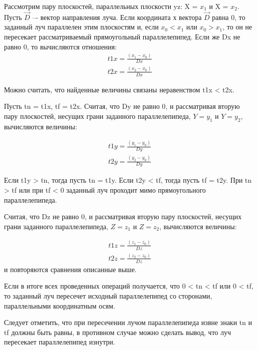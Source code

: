\documentclass[12pt,a4paper,oneside]{report}
\begin{document}
	 Рассмотрим пару плоскостей, параллельных плоскости yz: X = $x_1$ и X = $x_2$. Пусть $\vec{D}$ –- вектор направления луча. Если координата х вектора $\vec{D}$ равна 0, то заданный луч параллелен этим плоскостям и, если $x_0 < x_1$ или $x_0 > x_1$, то он не пересекает рассматриваемый прямоугольный параллелепипед. Если же Dx не равно 0, то вычисляются отношения:
	\begin{equation}
	\begin{gathered}
		t1x = \frac{(x_1 - x_0)}{Dx}\\
		t2x = \frac{(x_2 - x_0)}{Dx}
	\end{gathered}
	\end{equation}
	
	 Можно считать, что найденные величины связаны неравенством t1x < t2x.
	
	 Пусть tn = t1x, tf = t2x. Считая, что Dy не равно 0, и рассматривая вторую пару плоскостей, несущих грани заданного параллелепипеда, $Y = y_1$ и $Y = y_2$, вычисляются величины:
	
	\begin{equation}
	\begin{gathered}
	t1y = \frac{(y_1 - y_0)}{Dy}\\
	t2y = \frac{(y_2 - y_0)}{Dy}
	\end{gathered}
	\end{equation}
	
	 Если t1y > tn, тогда пусть tn = t1y. Если t2y < tf, тогда пусть tf = t2y.
	При tn > tf или при tf < 0 заданный луч проходит мимо прямоугольного параллелепипеда.
	
	 Считая, что Dz не равно 0, и рассматривая вторую пару плоскостей, несущих грани заданного параллелепипеда, $Z = z_1$ и $Z = z_2$, вычисляются величины:
	
	\begin{equation}
	\begin{gathered}
	t1z = \frac{(z_1 - z_0)}{Dz}\\
	t2z = \frac{(z_2 - z_0)}{Dz}
	\end{gathered}
	\end{equation}
	и повторяются сравнения описанные выше.
	
	 Если в итоге всех проведенных операций получается, что 0 < tn < tf или 0 < tf, то заданный луч пересечет исходный параллелепипед со сторонами, параллельными координатным осям.
	
	 Следует отметить, что при пересечении лучом параллелепипеда извне знаки tn и tf должны быть равны, в противном случае можно сделать вывод, что луч пересекает параллелепипед изнутри.
	
\end{document}
